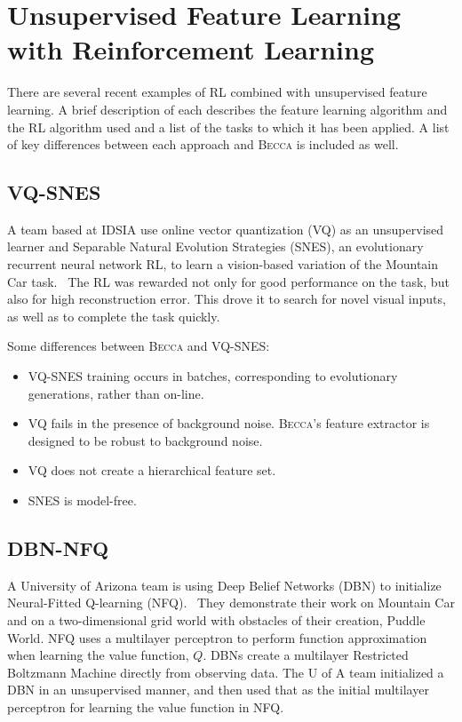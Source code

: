 \section{Unsupervised Feature Learning with Reinforcement Learning}
There are several recent examples of RL combined with unsupervised feature learning. A brief description of each describes the feature learning algorithm and the RL algorithm used and a list of the tasks to which it has been applied. A list of key differences between each approach and \textsc{Becca} is included as well.

\subsection{VQ-SNES} 
A team based at IDSIA use online vector quantization (VQ) as an unsupervised learner and Separable Natural Evolution Strategies (SNES), an evolutionary recurrent neural network RL, to learn a vision-based variation of the Mountain Car task.~\cite{cuccu11} The RL was rewarded not only for good performance on the task, but also for high reconstruction error. This drove it to search for novel visual inputs, as well as to complete the task quickly.

Some differences between \textsc{Becca} and VQ-SNES:
\begin{itemize}
\item VQ-SNES training occurs in batches, corresponding to evolutionary generations, rather than on-line.
\item VQ fails in the presence of background noise. \textsc{Becca}'s feature extractor is designed to be robust to background noise.
\item VQ does not create a hierarchical feature set.
\item SNES is model-free.
\end{itemize}

\subsection{DBN-NFQ} 
A University of Arizona team is using Deep Belief Networks (DBN) to initialize Neural-Fitted Q-learning (NFQ).~\cite{abtahi11} They demonstrate their work on Mountain Car and on a two-dimensional grid world with obstacles of their creation, Puddle World. NFQ uses a multilayer perceptron to perform function approximation when learning the value function, $Q$. DBNs create a multilayer Restricted Boltzmann Machine directly from observing data. The U of A team initialized a DBN in an unsupervised manner, and then used that as the initial multilayer perceptron for learning the value function in NFQ.

